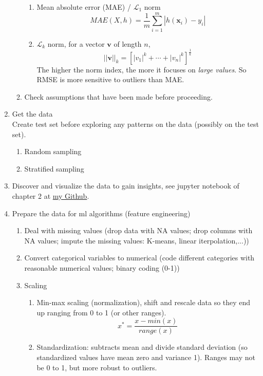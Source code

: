 \documentclass[12pt,oneside,a4paper]{article}
\numberwithin{equation}{section}
\newcommand{\bfv}{\boldsymbol{v}}
\newcommand{\bfx}{\boldsymbol{x}}
\begin{document}
\begin{enumerate}
\begin{enumerate}
\begin{enumerate}
\item Mean absolute error (MAE) / $\mathcal{L}_1$ norm
\begin{equation}
MAE(X, h) =\frac{1}{m} \sum_{i=1}^{m}|h(\bfx_{i}) - y_{i}|
\end{equation}
\item $\mathcal{L}_k$ norm, for a vector $\bfv$ of length $n$,
\begin{equation}
||\bfv||_k = \left[|v_1|^k + \cdots + |v_n|^k\right]^{\frac{1}{k}}
\end{equation}
The higher the norm index, the more it focuses on \emph{large values}. So RMSE is more sensitive to outliers than MAE.
\end{enumerate}
\item Check assumptions that have been made before proceeding. 
\end{enumerate}
\item Get the data \\
Create test set before exploring any patterns on the data (possibly on the test set).
\begin{enumerate}
\item Random sampling
\item Stratified sampling
\end{enumerate}
\item Discover and visualize the data to gain insights, see jupyter notebook of chapter 2 at \href{https://github.com/QianqianShan/HandsOnMachineLearning}{my Github}. 
\item Prepare the data for ml algorithms (feature engineering)
\begin{enumerate}
\item Deal with missing values (drop data with NA values; drop columns with NA values; impute the missing values: K-means, linear iterpolation,...))
\item Convert categorical variables to numerical (code different categories with reasonable numerical values; binary coding (0-1))
\item Scaling 
\begin{enumerate}
\item Min-max scaling (normalization), shift and rescale data so they end up ranging from 0 to 1 (or other ranges). 
\begin{equation}
x^\ast = \frac{x - min(x)}{range(x)}
\end{equation}
\item Standardization: subtracts mean and divide standard deviation (so standardized values have mean zero and variance 1). Ranges may not be 0 to 1, but more robust to outliers.

\end{enumerate}
\end{enumerate}
\end{enumerate}
\end{document}
